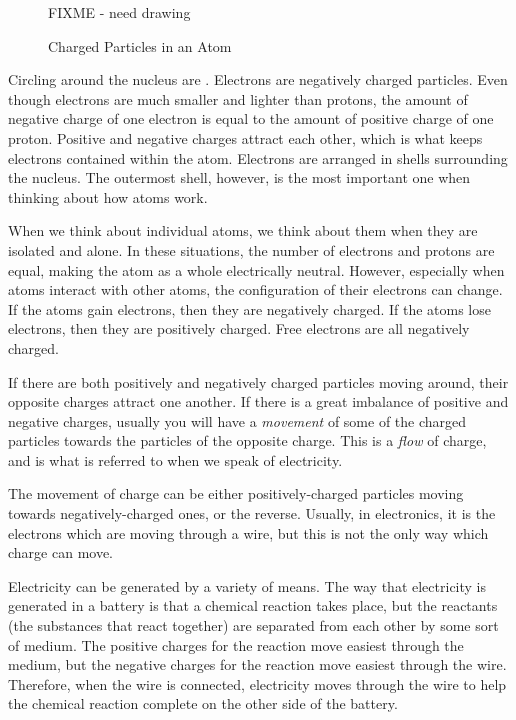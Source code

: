 \begin{figure}
\caption{Charged Particles in an Atom}
\label{figChargedParticles}
FIXME - need drawing
\end{figure}

Circling around the nucleus are .
Electrons are negatively charged particles. 
Even though electrons are much smaller and lighter than protons, the amount of negative charge of one electron is equal to the amount of positive charge of one proton.
Positive and negative charges attract each other, which is what keeps electrons contained within the atom.
Electrons are arranged in shells surrounding the nucleus.
The outermost shell, however, is the most important one when thinking about how atoms work.

When we think about individual atoms, we think about them when they are isolated and alone.
In these situations, the number of electrons and protons are equal, making the atom as a whole electrically neutral.
However, especially when atoms interact with other atoms, the configuration of their electrons can change.
If the atoms gain electrons, then they are negatively charged.
If the atoms lose electrons, then they are positively charged.
Free electrons are all negatively charged.

If there are both positively and negatively charged particles moving around, their opposite charges attract one another.
If there is a great imbalance of positive and negative charges, usually you will have a \emph{movement} of some of the charged particles towards the particles of the opposite charge.
This is a \emph{flow} of charge, and is what is referred to when we speak of electricity.

The movement of charge can be either positively-charged particles moving towards negatively-charged ones, or the reverse.
Usually, in electronics, it is the electrons which are moving through a wire, but this is not the only way which charge can move.

Electricity can be generated by a variety of means.
The way that electricity is generated in a battery is that a chemical reaction takes place, but the reactants (the substances that react together) are separated from each other by some sort of medium.  
The positive charges for the reaction move easiest through the medium, but the negative charges for the reaction move easiest through the wire.
Therefore, when the wire is connected, electricity moves through the wire to help the chemical reaction complete on the other side of the battery.

